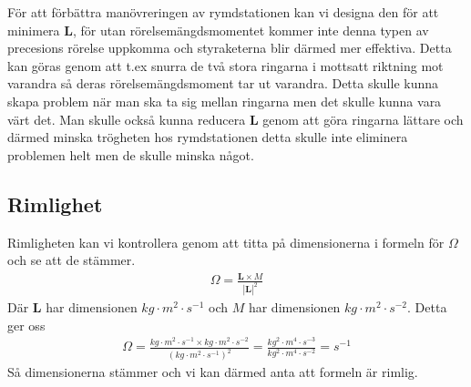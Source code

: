 \documentclass[a4paper]{article}
\begin{document}
För att förbättra manövreringen av rymdstationen kan vi designa den för att minimera $\mathbf{L}$, för utan rörelsemängdsmomentet kommer inte denna typen av precesions rörelse uppkomma och styraketerna blir därmed mer effektiva. Detta kan göras genom att t.ex snurra de två stora ringarna i mottsatt riktning mot varandra så deras rörelsemängdsmoment tar ut varandra. Detta skulle kunna skapa problem när man ska ta sig mellan ringarna men det skulle kunna vara värt det. Man skulle också kunna reducera $\mathbf{L}$ genom att göra ringarna lättare och därmed minska trögheten hos rymdstationen detta skulle inte eliminera problemen helt men de skulle minska något. 

\subsection*{Rimlighet}

Rimligheten kan vi kontrollera genom att titta på dimensionerna i formeln för $\Omega$ och se att de stämmer.
\begin{align*}
    \Omega = \frac{\mathbf{L} \times M}{|\mathbf{L}|^2}
\end{align*}
Där $\mathbf{L}$ har dimensionen $kg \cdot m^2 \cdot s^{-1}$ och $M$ har dimensionen $kg \cdot m^2 \cdot s^{-2}$. Detta ger oss
\begin{align*}
    \Omega = \frac{kg \cdot m^2 \cdot s^{-1} \times kg \cdot m^2 \cdot s^{-2}}{(kg \cdot m^2 \cdot s^{-1})^2} = \frac{kg^2 \cdot m^4  \cdot s^{-3}}{kg^2 \cdot m^4 \cdot s^{-2}} = s^{-1}
\end{align*}
Så dimensionerna stämmer och vi kan därmed anta att formeln är rimlig.
\end{document}

